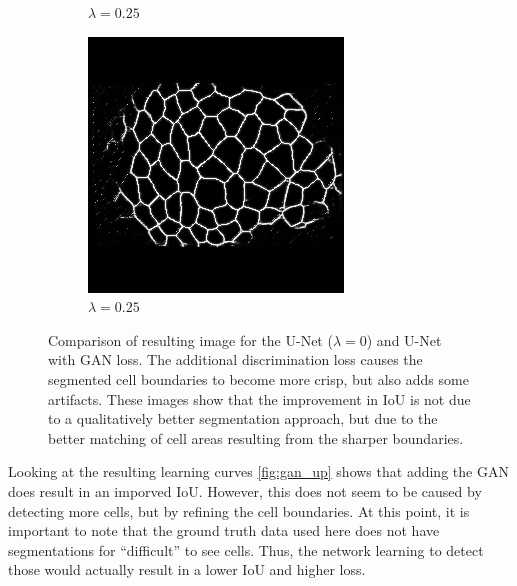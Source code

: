 \documentclass[aps,prl,twocolumn,groupedaddress,amsmath,amssymb]{revtex4-1}
\begin{document}
\begin{figure}[tbp]
\begin{subfigure}[c]{0.45\linewidth}
            \caption{$\lambda=0.25$}
        \end{subfigure}%
        \begin{subfigure}[c]{0.45\linewidth}
            \includegraphics[width=\linewidth]{figures/27-33.png}
            \caption{$\lambda=0.25$}
        \end{subfigure}
        \caption{Comparison of resulting image for the U-Net ($\lambda=0$) and U-Net with GAN loss.
         The additional discrimination loss causes the segmented cell boundaries
        to become more crisp, but also adds some artifacts. These images show that the improvement 
        in IoU is not due to a qualitatively better segmentation approach, but due to the better 
        matching of cell areas resulting from the sharper boundaries.}
        \label{fig:unet_vs_ganunet}
    \end{figure}

    Looking at the resulting learning curves \autoref{fig:gan_up} shows that adding the GAN does
    result in an imporved IoU. However, this does not seem to be caused by detecting more cells, but
    by refining the cell boundaries. At this point, it is important to note that the ground truth
    data used here does not have segmentations for ``difficult'' to see cells. Thus, the network
    learning to detect those would actually result in a lower IoU and higher loss.
\end{document}

